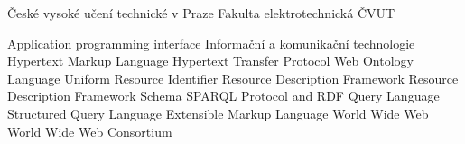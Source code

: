    {České vysoké učení technické v Praze}                          
    {Fakulta elektrotechnická ČVUT}

 {Application programming interface}
 {Informační a komunikační technologie}
 {Hypertext Markup Language}
 {Hypertext Transfer Protocol}
 {Web Ontology Language}
 {Uniform Resource Identifier}
 {Resource Description Framework}
 {Resource Description Framework Schema}
 {SPARQL Protocol and RDF Query Language}
 {Structured Query Language}
 {Extensible Markup Language}
 {World Wide Web}
 {World Wide Web Consortium}
